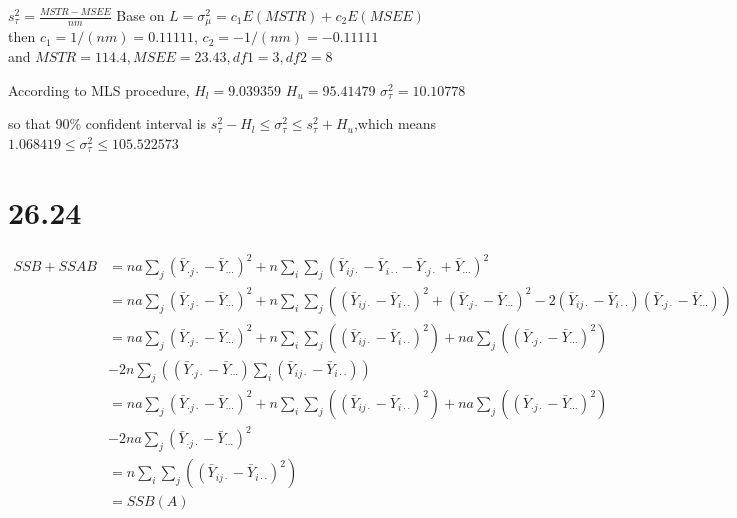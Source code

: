 \documentclass{article}\usepackage[]{graphicx}\usepackage[]{color}
\begin{document}
\begin{enumerate}[(a)]
\begin{center}
$s^2_\tau = \frac{MSTR-MSEE}{nm}$
Base on $L=\sigma_\mu^2=c_1E(MSTR)+c_2E(MSEE)$\\
then $c_1=1/(nm)=0.11111$, $c_2=-1/(nm)=-0.11111$\\
and $MSTR=114.4, MSEE=23.43, df1=3, df2=8$\\
\end{center}

According to MLS procedure, $H_l=9.039359$ \qquad $H_u=95.41479$ \qquad $\sigma_\tau^2=10.10778$

\qquad so that 90\% confident interval is  $s^2_\tau-H_l \leq \sigma_\tau^2 \leq s^2_\tau+H_u$,which means $1.068419 \leq \sigma_\tau^2 \leq 105.522573$

\end{enumerate}

\section{26.24}

\begin{displaymath}
\begin{split}
SSB+SSAB &= na\sum_{j}(\bar{Y}_{\cdot j \cdot}-\bar{Y}_{\cdots})^2 + n\sum_i\sum_j(\bar{Y}_{ij\cdot}-\bar{Y}_{i\cdot\cdot}-\bar{Y}_{\cdot j \cdot}+\bar{Y}_{\cdots})^2\\
         &= na\sum_{j}(\bar{Y}_{\cdot j \cdot}-\bar{Y}_{\cdots})^2 + n\sum_i\sum_j( (\bar{Y}_{ij\cdot}-\bar{Y}_{i\cdot\cdot})^2 + (\bar{Y}_{\cdot j \cdot}-\bar{Y}_{\cdots})^2  - 2(\bar{Y}_{ij\cdot}-\bar{Y}_{i\cdot\cdot})(\bar{Y}_{\cdot j \cdot}-\bar{Y}_{\cdots})  )\\
         &= na\sum_{j}(\bar{Y}_{\cdot j \cdot}-\bar{Y}_{\cdots})^2 + n\sum_i\sum_j((\bar{Y}_{ij\cdot}-\bar{Y}_{i\cdot\cdot})^2) + na\sum_j((\bar{Y}_{\cdot j \cdot}-\bar{Y}_{\cdots})^2)\\
         &- 2n\sum_j((\bar{Y}_{\cdot j \cdot}-\bar{Y}_{\cdots})\sum_i (\bar{Y}_{ij\cdot}-\bar{Y}_{i\cdot\cdot}))\\
         &= na\sum_{j}(\bar{Y}_{\cdot j \cdot}-\bar{Y}_{\cdots})^2 + n\sum_i\sum_j((\bar{Y}_{ij\cdot}-\bar{Y}_{i\cdot\cdot})^2) + na\sum_j((\bar{Y}_{\cdot j \cdot}-\bar{Y}_{\cdots})^2)\\
         &- 2na\sum_{j}(\bar{Y}_{\cdot j \cdot}-\bar{Y}_{\cdots})^2\\
         &= n\sum_i\sum_j((\bar{Y}_{ij\cdot}-\bar{Y}_{i\cdot\cdot})^2)\\
         &= SSB(A)
\end{split}
\end{displaymath}
\end{document}
